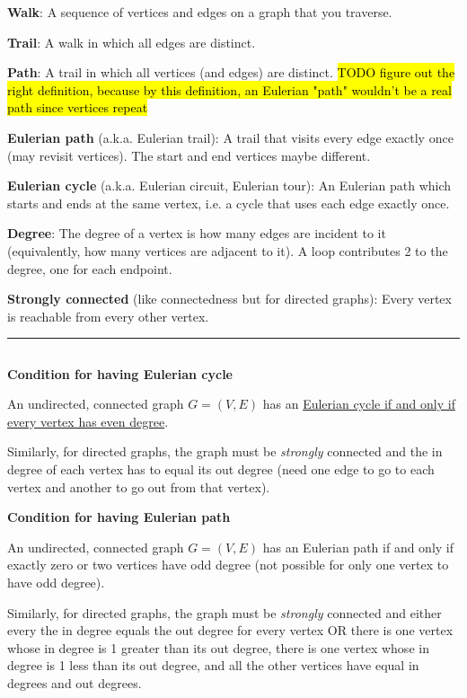 \textbf{Walk}: A sequence of vertices and edges on a graph that you traverse.

\textbf{Trail}: A walk in which all edges are distinct.

\textbf{Path}: A trail in which all vertices (and edges) are distinct. \hl{TODO figure out the right definition, because by this definition, an Eulerian "path" wouldn't be a real path since vertices repeat}

\textbf{Eulerian path} (a.k.a. Eulerian trail): A trail that visits every edge exactly once (may revisit vertices). The start and end vertices maybe different.

\textbf{Eulerian cycle} (a.k.a. Eulerian circuit, Eulerian tour): An Eulerian path which starts and ends at the same vertex, i.e. a cycle that uses each edge exactly once.

\textbf{Degree}: The degree of a vertex is how many edges are incident to it (equivalently, how many vertices are adjacent to it). A loop contributes 2 to the degree, one for each endpoint.

\textbf{Strongly connected} (like connectedness but for directed graphs): Every vertex is reachable from every other vertex.

\noindent\rule{\textwidth}{1pt}

\subsection*{}

\textbf{Condition for having Eulerian cycle}

An undirected, connected graph $G = (V, E)$ has an \ul{Eulerian cycle if and only if every vertex has even degree}.

Similarly, for directed graphs, the graph must be \emph{strongly} connected and the in degree of each vertex has to equal its out degree (need one edge to go to each vertex and another to go out from that vertex).

\textbf{Condition for having Eulerian path}

An undirected, connected graph $G = (V, E)$ has an Eulerian path if and only if exactly zero or two vertices have odd degree (not possible for only one vertex to have odd degree).

Similarly, for directed graphs, the graph must be \emph{strongly} connected and either every the in degree equals the out degree for every vertex OR there is one vertex whose in degree is 1 greater than its out degree, there is one vertex whose in degree is 1 less than its out degree, and all the other vertices have equal in degrees and out degrees.
